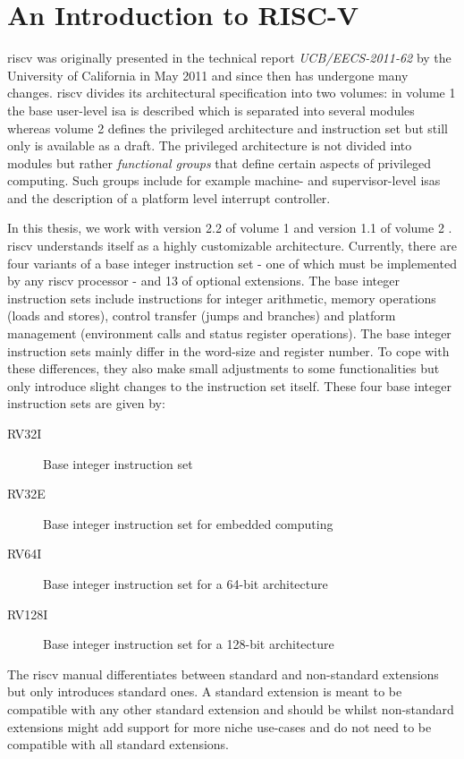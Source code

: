 \section{An Introduction to RISC-V}
\label{sec:risc-v-intro}

\gls{riscv} was originally presented in the technical report \textit{UCB/EECS-2011-62} by the University of California in May 2011 \cite{RiscVISA-org} and since then has undergone many changes.
\gls{riscv} divides its architectural specification into two volumes: in volume 1 the base user-level \gls{isa} is described which is separated into several modules whereas volume 2 defines the privileged architecture and instruction set but still only is available as a draft.
The privileged architecture is not divided into modules but rather \textit{functional groups} that define certain aspects of privileged computing.
Such groups include for example machine- and supervisor-level \glspl{isa} and the description of a platform level interrupt controller.


In this thesis, we work with version 2.2 of volume 1 \cite{RiscVISA} and version 1.1 of volume 2 \cite{RiscVISAP}.
\gls{riscv} understands itself as a highly customizable architecture.
Currently, there are four variants of a base integer instruction set - one of which must be implemented by any \gls{riscv} processor - and 13 of optional extensions.
The base integer instruction sets include instructions for integer arithmetic, memory operations (loads and stores), control transfer (jumps and branches) and platform management (environment calls and status register operations).
The base integer instruction sets mainly differ in the word-size and register number.
To cope with these differences, they also make small adjustments to some functionalities but only introduce slight changes to the instruction set itself.
These four base integer instruction sets are given by:
\begin{description}
    \item[RV32I] Base integer instruction set
    \item[RV32E] Base integer instruction set for embedded computing
    \item[RV64I] Base integer instruction set for a 64-bit architecture
    \item[RV128I] Base integer instruction set for a 128-bit architecture
\end{description}

The \gls{riscv} manual differentiates between standard and non-standard extensions but only introduces standard ones.
A standard extension is meant to be compatible with any other standard extension and should be  whilst non-standard extensions might add support for more niche use-cases and do not need to be compatible with all standard extensions.

